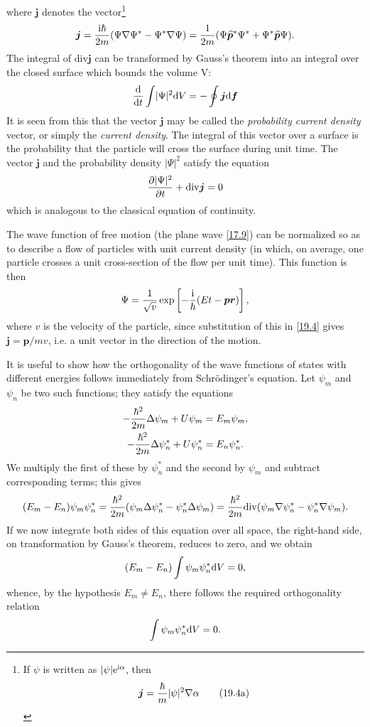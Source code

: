where $ \bm{j} $ denotes the vector\footnote{If $\psi$ is written as $ \lvert\psi\rvert\mathrm{e}^{\mathrm{i}\alpha} $, then
	\begin{equation}\label{19.4a}
	\bm{j}=\frac{\hbar}{m}\lvert\psi\rvert^2\nabla\alpha\tag{19.4a}
	\end{equation}
}
\begin{equation}\label{19.4}
\bm{j}=\frac{\mathrm{i}\hbar}{2m}(\Psi\nabla\Psi^*-\Psi^*\nabla\Psi)=\frac{1}{2m}(\Psi\widehat{\bm{p}}^*\Psi^*+\Psi^*\widehat{\bm{p}}\Psi).
\end{equation}
The integral of $ \mathrm{div }\bm{j} $ can be transformed by Gauss’s theorem into an integral over the closed surface which bounds the volume V:
\begin{equation}\label{19.5}
\frac{\mathrm{d}}{\mathrm{d} t}\int\lvert\Psi\rvert^2\mathrm{d} V=-\oint\bm{j}\mathrm{d}\bm{f}
\end{equation}
It is seen from this that the vector $ \bm{j} $ may be called the \textit{probability current density} vector, or simply the \textit{current density}. The integral of this vector over a surface is the probability that the particle will cross the surface during unit time. The vector $ \bm{j} $ and the probability density $ \lvert\Psi\rvert^2 $ satisfy the equation
\begin{equation}\label{19.6}
\frac{\partial\lvert\Psi\rvert^2}{\partial t}+\mathrm{div}\bm{j}=0
\end{equation}
which is analogous to the classical equation of continuity.

The wave function of free motion (the plane wave \eqref{17.9}) can be normalized so as to describe a flow of particles with unit current density (in which, on average, one particle crosses a unit cross-section of the flow per unit time). This function is then
\begin{equation}\label{19.7}
\Psi=\frac{1}{\sqrt{v}}\exp\left[ -\frac{\mathrm{i}}{\hbar}(Et-\bm{p}\bm{r})\right],
\end{equation}
where $ v $ is the velocity of the particle, since substitution of this in \eqref{19.4} gives $ \bm{j}= \bm{p}/mv $, i.e. a unit vector in the direction of the motion.

It is useful to show how the orthogonality of the wave functions of states with different energies follows immediately from Schr\"odinger's equation. Let $\psi_m$ and $\psi_n$ be two such functions; they satisfy the equations
\begin{align*}
-\frac{\hbar^2}{2m}\Delta\psi_m+U\psi_m&=E_m\psi_m,\\
-\frac{\hbar^2}{2m}\Delta\psi_n^*+U\psi_n^*&=E_n\psi_n^*.
\end{align*}
We multiply the first of these by $ \psi_n^* $ and the second by $\psi_m$ and subtract corresponding terms; this gives
\[ (E_m-E_n)\psi_m\psi_n^*=\frac{\hbar^2}{2m}(\psi_m\Delta\psi_n^*-\psi_n^*\Delta\psi_m)=\frac{\hbar^2}{2m}\mathrm{div}(\psi_m\nabla\psi_n^*-\psi_n^*\nabla\psi_m). \]
If we now integrate both sides of this equation over all space, the right-hand side, on transformation by Gauss’s theorem, reduces to zero, and we obtain
\[ (E_m-E_n)\int\psi_m\psi_n^*\mathrm{d} V=0, \]
whence, by the hypothesis $ E_m\ne E_n $, there follows the required orthogonality relation
\[ \int\psi_m\psi_n^*\mathrm{d} V=0. \]
